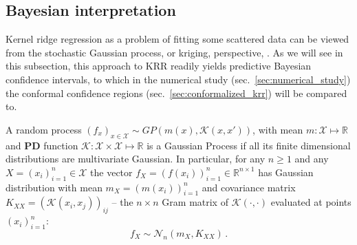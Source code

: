\documentclass[a4paper,14pt]{extarticle}
\newcommand{\Ncal}{\mathcal{N}}
\newcommand{\Kcal}{\mathcal{K}}
\newcommand{\Xcal}{\mathcal{X}}
\newcommand{\Real}{\mathbb{R}}
\begin{document}
\subsection{Bayesian interpretation} %
\label{sub:bayesian_interpretation_of_krr}

Kernel ridge regression as a problem of fitting some scattered data can be viewed
from the stochastic Gaussian process, or kriging, perspective, \cite{rasmussen2006}.
As we will see in this subsection, this approach to KRR readily yields predictive
Bayesian confidence intervals, to which in the numerical study (sec.~\ref{sec:numerical_study})
the conformal confidence regions (sec.~\ref{sec:conformalized_krr}) will be compared
to.

A random process $(f_x)_{x\in \Xcal} \sim GP(m(x), \Kcal(x,x'))$, with mean $m : \Xcal
\mapsto \Real$ and \textbf{PD} function $\Kcal : \Xcal \times \Xcal \mapsto \Real$
is a Gaussian Process if all its finite dimensional distributions are multivariate
Gaussian. In particular, for any $n\geq1$ and any $X = (x_i)_{i=1}^n \in \Xcal$ the
vector $f_X = (f(x_i))_{i=1}^n \in \Real^{n\times 1}$ has Gaussian distribution with
mean $m_X = (m(x_i))_{i=1}^n$ and covariance matrix $K_{XX} = (\Kcal(x_i,x_j))_{ij}$ --
the $n\times n$ Gram matrix of $\Kcal(\cdot,\cdot)$ evaluated at points $(x_i)_{i=1}^n$:
\begin{equation*}
  f_X \sim \Ncal_n(m_X, K_{XX}) \,.
\end{equation*}
\end{document}
